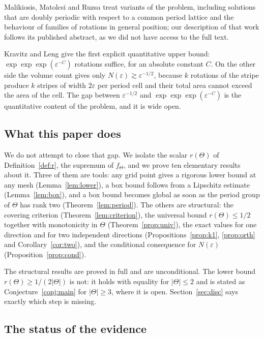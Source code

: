 \documentclass[11pt]{article}
\theoremstyle{plain}
\theoremstyle{definition}
\theoremstyle{remark}
\begin{document}
Malikiosis, Matolcsi and Ruzsa \cite{mmr2013} treat variants of the problem, including solutions that
are doubly periodic with respect to a common period lattice and the behaviour of families of rotations
in general position; our description of that work follows its published abstract, as we did not have
access to the full text.

Kravitz and Leng \cite{kravitzleng2025} give the first explicit quantitative upper bound:
$\exp\exp\exp(\varepsilon^{-C})$ rotations suffice, for an absolute constant $C$. On the other side the
volume count gives only $N(\varepsilon)\gtrsim\varepsilon^{-1/2}$, because $k$ rotations of the stripe
produce $k$ stripes of width $2\varepsilon$ per period cell and their total area cannot exceed the area
of the cell. The gap between $\varepsilon^{-1/2}$ and $\exp\exp\exp(\varepsilon^{-C})$ is the
quantitative content of the problem, and it is wide open.

\subsection{What this paper does}

We do not attempt to close that gap. We isolate the scalar $r(\Theta)$ of
Definition~\ref{def:r}, the supremum of $f_\Theta$, and we prove ten elementary results about it.
Three of them are tools: any grid point gives a rigorous lower bound at any mesh
(Lemma~\ref{lem:lower}), a box bound follows from a Lipschitz estimate (Lemma~\ref{lem:box}), and a box
bound becomes global as soon as the period group of $\Theta$ has rank two
(Theorem~\ref{lem:period}). The others are structural: the covering criterion
(Theorem~\ref{lem:criterion}), the universal bound $r(\Theta)\le1/2$ together with monotonicity in
$\Theta$ (Theorem~\ref{prop:univ}), the exact values for one direction and for two independent
directions (Propositions~\ref{prop:k1}, \ref{prop:orth} and Corollary~\ref{cor:two}), and the
conditional consequence for $N(\varepsilon)$ (Proposition~\ref{prop:cond}).

The structural results are proved in full and are unconditional. The lower bound
$r(\Theta)\ge1/(2|\Theta|)$ is not: it holds with equality for $|\Theta|\le2$ and is stated as
Conjecture~\ref{conj:main} for $|\Theta|\ge3$, where it is open. Section~\ref{sec:disc} says exactly
which step is missing.

\subsection{The status of the evidence}
\end{document}
